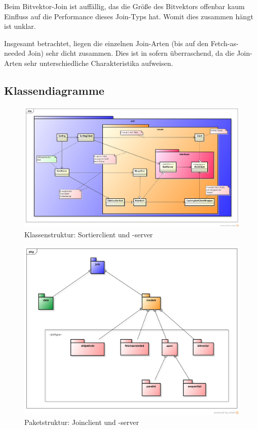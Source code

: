 \documentclass[fontsize=12pt,a4paper,headinclude=no,headings=small]{scrartcl}
\begin{document}
Beim Bitvektor-Join ist auffällig, das die Größe des Bitvektors offenbar kaum Einfluss auf die Performance dieses Join-Typs hat. Womit dies zusammen hängt ist unklar. 

Insgesamt betrachtet, liegen die einzelnen Join-Arten (bis auf den Fetch-as-needed Join) sehr dicht zusammen. Dies ist in sofern überraschend, da die Join-Arten sehr unterschiedliche Charakteristika aufweisen.

\begin{appendix}
\section{Klassendiagramme}
\begin{figure}[H]
	\centering
 	\includegraphics[width=\textwidth]{class-diagrams/sort.png}
	\caption{Klassenstruktur: Sortierclient und -server}
\end{figure}

\begin{figure}[H]
	\centering
 	\includegraphics[width=\textwidth]{class-diagrams/join-packages.png}
	\caption{Paketstruktur: Joinclient und -server}
\end{figure}


\end{appendix}
\end{document}
